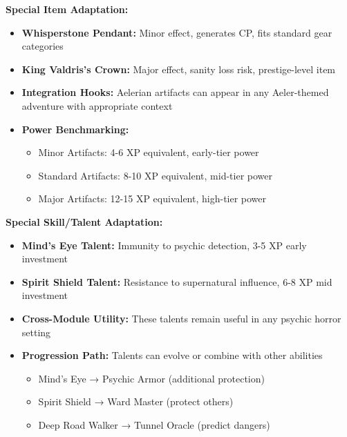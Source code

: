 \documentclass[11pt]{article}
\begin{document}
\begin{itemize}
\begin{itemize}
\begin{itemize}
\begin{itemize}
\begin{itemize}
\textbf{Special Item Adaptation:} \begin{itemize} \item \textbf{Whisperstone Pendant:} Minor effect, generates CP, fits standard gear categories \item \textbf{King Valdris's Crown:} Major effect, sanity loss risk, prestige-level item \item \textbf{Integration Hooks:} Aelerian artifacts can appear in any Aeler-themed adventure with appropriate context \item \textbf{Power Benchmarking:} \begin{itemize} \item Minor Artifacts: 4-6 XP equivalent, early-tier power \item Standard Artifacts: 8-10 XP equivalent, mid-tier power \item Major Artifacts: 12-15 XP equivalent, high-tier power \end{itemize} \end{itemize}

\textbf{Special Skill/Talent Adaptation:} \begin{itemize} \item \textbf{Mind's Eye Talent:} Immunity to psychic detection, 3-5 XP early investment \item \textbf{Spirit Shield Talent:} Resistance to supernatural influence, 6-8 XP mid investment \item \textbf{Cross-Module Utility:} These talents remain useful in any psychic horror setting \item \textbf{Progression Path:} Talents can evolve or combine with other abilities \begin{itemize} \item Mind's Eye → Psychic Armor (additional protection) \item Spirit Shield → Ward Master (protect others) \item Deep Road Walker → Tunnel Oracle (predict dangers) \end{itemize} \end{itemize}


\end{itemize}
\end{itemize}
\end{itemize}
\end{itemize}
\end{itemize}
\end{document}
